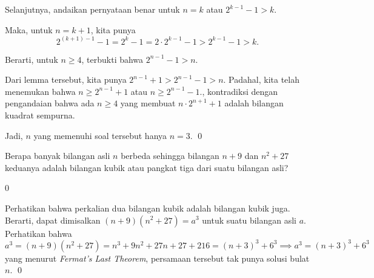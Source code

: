 \documentclass[11pt]{scrartcl}
\begin{document}
\begin{soalbaru}
\begin{solusi}
\begin{lemmarev}
\begin{buktilemma}
			Selanjutnya, andaikan pernyataan benar untuk $n=k$ atau $2^{k-1}-1 > k$.
			
			Maka, untuk $n=k+1$, kita punya 
			$$2^{(k+1)-1}-1=2^k-1=2 \cdot 2^{k-1} -1 > 2^{k-1}-1 > k.$$
			
			Berarti, untuk $n \ge 4$, terbukti bahwa $2^{n-1}-1 > n$.
			\end{buktilemma}
			\end{lemmarev}
			
			Dari lemma tersebut, kita punya $2^{n-1}+1 > 2^{n-1}-1 > n$. Padahal, kita telah menemukan bahwa $n \ge 2^{n-1}+1$ atau $n \ge 2^{n-1}-1$., kontradiksi dengan pengandaian bahwa ada $n \ge 4$ yang membuat $n \cdot 2^{n+1} +1$ adalah bilangan kuadrat sempurna.
			
			Jadi, $n$ yang memenuhi soal tersebut hanya $n=3$. \qed
		\end{solusi}
	\end{soalbaru}
\vspace{20pt}
	\begin{soalbaru}
		Berapa banyak bilangan asli $n$ berbeda sehingga bilangan $n+9$ dan $n^2+27$ keduanya adalah bilangan kubik atau pangkat tiga dari suatu bilangan asli?
		
		\begin{jawaban}
				0
				\end{jawaban}
				\begin{solusi}
				Perhatikan bahwa perkalian dua bilangan kubik adalah bilangan kubik juga. Berarti, dapat dimisalkan $(n+9)(n^2+27)=a^3$ untuk suatu bilangan asli $a$. Perhatikan bahwa $a^3=(n+9)(n^2+27)=n^3+9n^2+27n+27+216=(n+3)^3+6^3 \implies a^3=(n+3)^3+6^3$ yang menurut \textit{Fermat's Last Theorem}, persamaan tersebut tak punya solusi bulat $n$. \qed
				\end{solusi}
	\end{soalbaru}
	
\end{document}
